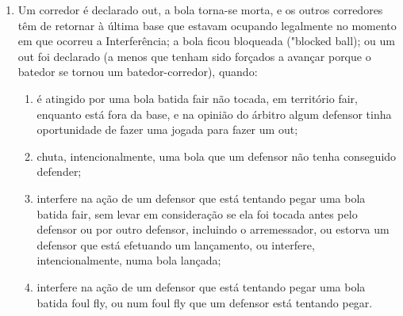 \begin{enumerate}[label=(\alph*)]
\begin{enumerate}[label=\roman*.]
			  \begin{enumerate}[label=\arabic*)]
			 	\item for feita uma jogada sobre ele ou outro corredor (uma simulação de toque é considerada uma jogada);
				\item o arremessador não está mais dentro do Círculo do Arremessador, com a bola na mão; ou
			 	\item o arremessador efetua um arremesso ao batedor.
			\end{enumerate}
		\item Uma base por \glspl{ball} ou um terceiro \gls{strike} não agarrado em que o corredor é autorizado a correr é tratado da mesma forma que uma bola batida. O batedor-corredor pode continuar avançando após ultrapassar a primeira base, e é autorizado a correr em direção à segunda base, desde  que ele não pare na primeira base. Se ele parar após ultrapassar a primeira base fazendo uma curva, terá de retornar à base, ou continuar  avançando à segunda base, imediatamente; e
		\item  o batedor-corredor é declarado \gls{out} por ter interferido numa jogada no \gls{homeplate} para tentar evitar uma eliminação evidente de um corredor  que esteja avançando para \gls{home}. O corredor que está avançando é declarado \gls{out} e os outros corredores têm de retornar à última base que  estavam ocupando no momento do arremesso.
	\end{enumerate}

	\item  Um corredor é declarado \gls{out}, a bola torna-se morta, e os outros corredores
	 têm de retornar à última base que estavam ocupando legalmente no momento em que ocorreu a Interferência; a bola ficou bloqueada ("\gls{blocked ball}); ou um \gls{out} foi declarado (a menos que tenham sido forçados a avançar porque o batedor se tornou um batedor-corredor), quando:

\begin{enumerate}[label=\roman*.]
	\item é atingido por uma bola batida \gls{fair} não tocada, em território \gls{fair}, enquanto está fora da base, e na opinião do árbitro algum defensor tinha oportunidade de fazer uma jogada para fazer um \gls{out};
	\item chuta, intencionalmente, uma bola que um defensor não tenha conseguido defender;
	\item interfere na ação de um defensor que está tentando pegar uma bola batida \gls{fair}, sem levar em consideração se ela foi tocada antes pelo defensor ou por outro defensor, incluindo o arremessador, ou estorva um defensor que está efetuando um lançamento, ou interfere, intencionalmente, numa bola lançada;
	\item interfere na ação de um defensor que está tentando pegar uma bola batida \gls{foul fly}, ou num \gls{foul fly} que um defensor está tentando pegar.


\end{enumerate}
\end{enumerate}
